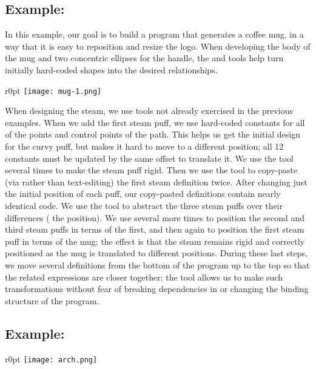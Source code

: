 \subsection{Example: \exampleThree{}}

In this example, our goal is to build a program that generates a
coffee mug, in a way that it is easy to reposition and resize the logo.
When developing the body of the mug and two concentric ellipses for
the handle, the  and  tools help turn
initially hard-coded shapes into the desired relationships.

\begin{wrapfigure}{r}{0pt}
\texttt{[image: mug-1.png]}
\end{wrapfigure}

When designing the steam, we use tools not already exercised in the previous
examples. When we add the first steam puff, we use hard-coded
constants for all of the points and control points of the path. This
helps us get the initial design for the curvy puff, but makes it hard
to move to a different position; all 12 constants must be updated by
the same offset to translate it. We use the  tool
several times to make the steam puff rigid.
Then we use the  tool to copy-paste (via \deuce{}
rather than text-editing) the first steam definition twice. After
changing just the initial position of each puff, our copy-pasted
definitions contain nearly identical code. We use the  tool to abstract the
three steam puffs over their differences (\ie{} the position).
We use  several more times to position the
second and third steam puffs in terms of the first, and then again to
position the first steam puff in terms of the mug; the effect is that
the steam remains rigid and correctly positioned as the mug is
translated to different positions. During these last steps, we move
several definitions from the bottom of the program up to the top so
that the related expressions are closer together; the 
tool allows us to make such transformations without fear of breaking
dependencies in or changing the binding structure of the program.


\subsection{Example: \exampleFour{}}

\begin{wrapfigure}{r}{0pt}
\texttt{[image: arch.png]}
\end{wrapfigure}

